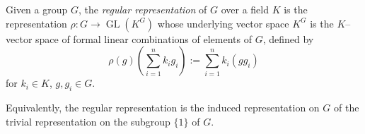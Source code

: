 \documentclass[12pt]{article}
\newcommand{\GL}{\operatorname{GL}}
\begin{document}
Given a group $G$, the {\em regular representation} of $G$ over a field $K$ is the representation $\rho: G \longrightarrow \GL(K^G)$ whose underlying vector space $K^G$ is the $K$--vector space of formal linear combinations of elements of $G$, defined by
$$
\rho(g)\left(\sum_{i=1}^n k_i g_i\right) := \sum_{i=1}^n k_i (g g_i)
$$
for $k_i \in K$, $g, g_i \in G$.

Equivalently, the regular representation is the induced representation on $G$ of the trivial representation on the subgroup $\{1\}$ of $G$.
\end{document}
